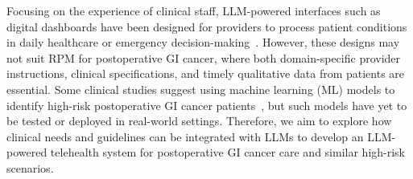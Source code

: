 Focusing on the experience of clinical staff, LLM-powered interfaces such as digital dashboards have been designed for providers to process patient conditions in daily healthcare or emergency decision-making~\cite{yangWishThereWere2024, zhangRethinkingHumanAICollaboration2024}. However, these designs may not suit RPM for postoperative GI cancer, where both domain-specific provider instructions, clinical specifications, and timely qualitative data from patients are essential. Some clinical studies suggest using machine learning (ML) models to identify high-risk postoperative GI cancer patients~\cite{vankootenPreoperativeRiskFactors2021, chenDevelopmentValidationMachine2022a}, but such models have yet to be tested or deployed in real-world settings. Therefore, we aim to explore how clinical needs and guidelines can be integrated with LLMs to develop an LLM-powered telehealth system for postoperative GI cancer care and similar high-risk scenarios.
